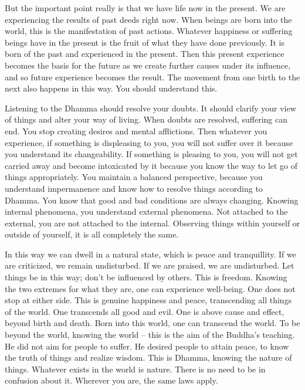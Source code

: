 But the important point really is that we have life now in the present. We are experiencing the results of past deeds right now. When beings are born into the world, this is the manifestation of past actions. Whatever happiness or suffering beings have in the present is the fruit of what they have done previously. It is born of the past and experienced in the present. Then this present experience becomes the basis for the future as we create further causes under its influence, and so future experience becomes the result. The movement from one birth to the next also happens in this way. You should understand this.

Listening to the Dhamma should resolve your doubts. It should clarify your view of things and alter your way of living. When doubts are resolved, suffering can end. You stop creating desires and mental afflictions. Then whatever you experience, if something is displeasing to you, you will not suffer over it because you understand its changeability. If something is pleasing to you, you will not get carried away and become intoxicated by it because you know the way to let go of things appropriately. You maintain a balanced perspective, because you understand impermanence and know how to resolve things according to Dhamma. You know that good and bad conditions are always changing. Knowing internal phenomena, you understand external phenomena. Not attached to the external, you are not attached to the internal. Observing things within yourself or outside of yourself, it is all completely the same.

In this way we can dwell in a natural state, which is peace and tranquillity. If we are criticized, we remain undisturbed. If we are praised, we are undisturbed. Let things be in this way; don't be influenced by others. This is freedom. Knowing the two extremes for what they are, one can experience well-being. One does not stop at either side. This is genuine happiness and peace, transcending all things of the world. One transcends all good and evil. One is above cause and effect, beyond birth and death. Born into this world, one can transcend the world. To be beyond the world, knowing the world -- this is the aim of the Buddha's teaching. He did not aim for people to suffer. He desired people to attain peace, to know the truth of things and realize wisdom. This is Dhamma, knowing the nature of things. Whatever exists in the world is nature. There is no need to be in confusion about it. Wherever you are, the same laws apply.

